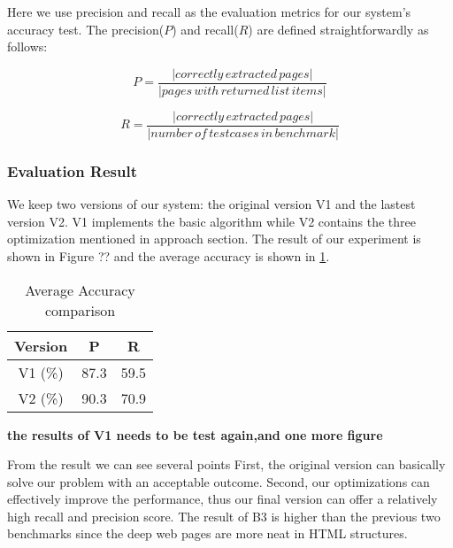 Here we use precision and recall as the evaluation metrics for our system's accuracy test. 
The precision($P$) and recall($R$) are defined straightforwardly as follows:

\begin{equation}
	P = \frac{|correctly\,extracted\,pages|}{|pages\,with\,returned\,list\,items|}
\end{equation}

\begin{equation}
	R = \frac{|correctly\,extracted\,pages|}{|number\,of\,testcases\,in\,benchmark|}
\end{equation}

\subsubsection{Evaluation Result}
We keep two versions of our system:
the original version V1
and the lastest version V2.
V1 implements the basic algorithm 
while V2 contains the three optimization mentioned in approach section.
The result of our experiment is shown in Figure ?? and 
the average accuracy is shown in \ref{tab:EvalRes1}.

\begin{table}[tb]
\centering
\caption{Average Accuracy comparison}
\label{tab:EvalRes1}
\begin{tabular}{|c||c|c|} 
\hline
Version & P & R\\\hline
V1 (\%)& 87.3 & 59.5 \\\hline
V2 (\%)& 90.3 & 70.9 \\\hline
\end{tabular}
\end{table}
{\bf the results of V1 needs to be test again,and one more figure}

From the result we can see several points
First, the original version can basically solve our problem with an acceptable outcome.
Second, our optimizations can effectively improve the performance,
thus our final version can offer a relatively high recall and precision score.
The result of B3 is higher than the previous two benchmarks
since the deep web pages are more neat in HTML structures.


